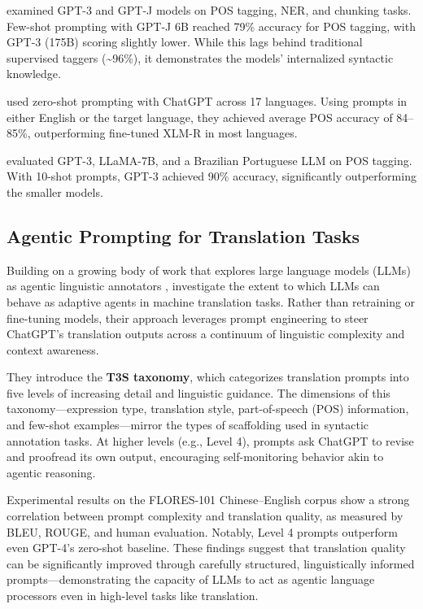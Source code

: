 \citet{blevins2023llmpos} examined GPT-3 and GPT-J models on POS tagging, NER, and chunking tasks. Few-shot prompting with GPT-J 6B reached 79\% accuracy for POS tagging, with GPT-3 (175B) scoring slightly lower. While this lags behind traditional supervised taggers (\textasciitilde96\%), it demonstrates the models' internalized syntactic knowledge.

\citet{lai2023chatgptpos} used zero-shot prompting with ChatGPT across 17 languages. Using prompts in either English or the target language, they achieved average POS accuracy of 84--85\%, outperforming fine-tuned XLM-R in most languages.

\citet{machado2024portpos} evaluated GPT-3, LLaMA-7B, and a Brazilian Portuguese LLM on POS tagging. With 10-shot prompts, GPT-3 achieved 90\% accuracy, significantly outperforming the smaller models.

\subsection{Agentic Prompting for Translation Tasks}

Building on a growing body of work that explores large language models (LLMs) as agentic linguistic annotators \citep[e.g.,][]{lai2023chatgptpos, blevins2023llmpos}, \citet{jiao2024gradable} investigate the extent to which LLMs can behave as adaptive agents in machine translation tasks. Rather than retraining or fine-tuning models, their approach leverages prompt engineering to steer ChatGPT's translation outputs across a continuum of linguistic complexity and context awareness.

They introduce the \textbf{T3S taxonomy}, which categorizes translation prompts into five levels of increasing detail and linguistic guidance. The dimensions of this taxonomy—expression type, translation style, part-of-speech (POS) information, and few-shot examples—mirror the types of scaffolding used in syntactic annotation tasks. At higher levels (e.g., Level 4), prompts ask ChatGPT to revise and proofread its own output, encouraging self-monitoring behavior akin to agentic reasoning.

Experimental results on the FLORES-101 Chinese--English corpus show a strong correlation between prompt complexity and translation quality, as measured by BLEU, ROUGE, and human evaluation. Notably, Level 4 prompts outperform even GPT-4's zero-shot baseline. These findings suggest that translation quality can be significantly improved through carefully structured, linguistically informed prompts—demonstrating the capacity of LLMs to act as agentic language processors even in high-level tasks like translation.

